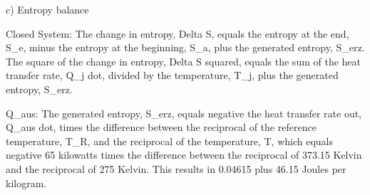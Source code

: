 c) Entropy balance

Closed System:
The change in entropy, Delta S, equals the entropy at the end, S_e, minus the entropy at the beginning, S_a, plus the generated entropy, S_erz.
The square of the change in entropy, Delta S squared, equals the sum of the heat transfer rate, Q_j dot, divided by the temperature, T_j, plus the generated entropy, S_erz.

Q_aus:
The generated entropy, S_erz, equals negative the heat transfer rate out, Q_aus dot, times the difference between the reciprocal of the reference temperature, T_R, and the reciprocal of the temperature, T, which equals negative 65 kilowatts times the difference between the reciprocal of 373.15 Kelvin and the reciprocal of 275 Kelvin.
This results in 0.04615 plus 46.15 Joules per kilogram.